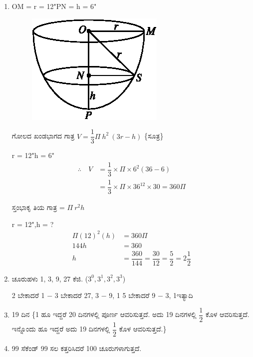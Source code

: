 \begin{enumerate}
\item OM = r = 12"\qquad PN = h = 6"

\begin{figure}[!h]
\centering
\includegraphics{images/chap5/ans27.eps}
\end{figure}

ಗೋಲದ ಖಂಡಭಾಗದ ಗಾತ್ರ $V = \dfrac{1}{3} \Pi~ h^{2}~ (3r - h)$ \{ಸೂತ್ರ\}

r = 12"\qquad h = 6"
\begin{align*}
\therefore\quad V & = \dfrac{1}{3} \times \Pi \times 6^{2} (36 - 6)\\
& = \dfrac{1}{3} \times \Pi \times 36^{12} \times 30 = 360 \Pi
\end{align*}

ಸ್ತಂಭಾಕೃ ತಿಯ ಗಾತ್ರ = $\Pi~ r^{2}h$

r = 12",\qquad h = ?
\begin{align*}
\Pi(12)^{2} (h) & = 360 \Pi\\
144 h & = 360\\
h & = \dfrac{360}{144} = \dfrac{30}{12} = \dfrac{5}{2} = 2\dfrac{1}{2}
\end{align*}

\item ಚೂರುಹಳು 1, 3, 9, 27 ಕೆಜಿ. ($3^{0}, 3^{1}, 3^{2}, 3^{3}$)

2 ಬೇಕಾದರೆ 1 $-$ 3 ಬೇಕಾದರೆ 27, 3 $-$ 9, 1
5 ಬೇಕಾದರೆ 9 $-$ 3, 1\quad ಇತ್ಯಾದಿ 

\item 19 ದಿನ \{1 ಹೂ ಇದ್ದರೆ 20 ದಿನಗಳಲ್ಲಿ ಪೂರ್ಣ ಆವರಿಸುತ್ತದೆ. ಅದು 19 ದಿನಗಳಲ್ಲಿ $\dfrac{1}{2}$ ಕೊಳ ಆವರಿಸುತ್ತದೆ. ಇನ್ನೊಂದು ಹೂ ಇದ್ದರೆ ಅದು 19 ದಿನಗಳಲ್ಲಿ $\dfrac{1}{2}$ ಕೊಳ ಆವರಿಸುತ್ತದೆ.\}

\item 99 ಸೆಕೆಂಡ್ 99 ಸಲ ಕತ್ತರಿಸಿದರೆ 100 ಚೂರುಗಳಾಗುತ್ತದೆ.
\end{enumerate}
